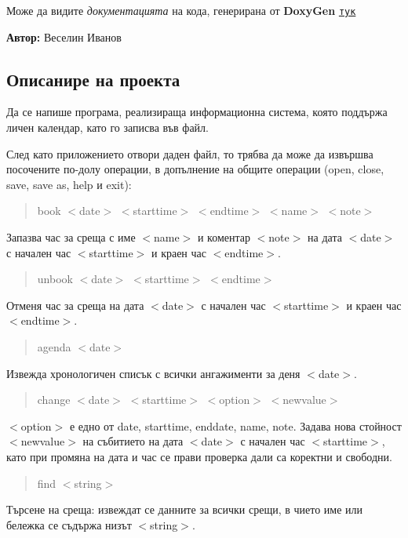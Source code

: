 Може да видите {\itshape документацията} на кода, генерирана от {\bfseries Doxy\+Gen} \href{https://ivanov1234159.github.io/Calendar/html/index.html}{\tt тук}

{\bfseries Автор\+:} Веселин Иванов

\subsection*{Описанире на проекта}

Да се напише програма, реализираща информационна система, която поддържа личен календар, като го записва във файл.

След като приложението отвори даден файл, то трябва да може да извършва посочените по-\/долу операции, в допълнение на общите операции (open, close, save, save as, help и exit)\+:

\begin{quote}
book $<$date$>$ $<$starttime$>$ $<$endtime$>$ $<$name$>$ $<$note$>$ \end{quote}


Запазва час за среща с име $<$name$>$ и коментар $<$note$>$ на дата $<$date$>$ с начален час $<$starttime$>$ и краен час $<$endtime$>$.

\begin{quote}
unbook $<$date$>$ $<$starttime$>$ $<$endtime$>$ \end{quote}


Отменя час за среща на дата $<$date$>$ с начален час $<$starttime$>$ и краен час $<$endtime$>$.

\begin{quote}
agenda $<$date$>$ \end{quote}


Извежда хронологичен списък с всички ангажименти за деня $<$date$>$.

\begin{quote}
change $<$date$>$ $<$starttime$>$ $<$option$>$ $<$newvalue$>$ \end{quote}


$<$option$>$ е едно от date, starttime, enddate, name, note. Задава нова стойност $<$newvalue$>$ на събитието на дата $<$date$>$ с начален час $<$starttime$>$, като при промяна на дата и час се прави проверка дали са коректни и свободни.

\begin{quote}
find $<$string$>$ \end{quote}


Търсене на среща\+: извеждат се данните за всички срещи, в чието име или бележка се съдържа низът $<$string$>$.

